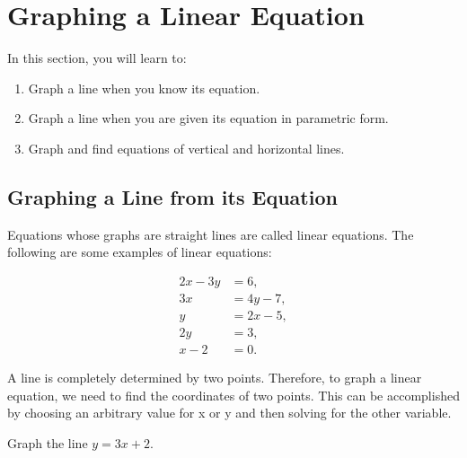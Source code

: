\section{Graphing a Linear Equation}

In this section, you will learn to:

\begin{enumerate}
    \item Graph a line when you know its equation.
    \item Graph a line when you are given its equation in parametric form.
    \item Graph and find equations of vertical and horizontal lines.
\end{enumerate}

\subsection{Graphing a Line from its Equation}

Equations whose graphs are straight lines are called linear equations. The following are some examples of linear equations:

\begin{align*}
2x - 3y &= 6, \\
3x &= 4y - 7, \\
y &= 2x - 5, \\
2y &= 3, \\
x - 2 &= 0.
\end{align*}

A line is completely determined by two points. Therefore, to graph a linear equation, we need to find the coordinates of two points. This can be accomplished by choosing an arbitrary value for x or y and then solving for the other variable.

\begin{example}
Graph the line \(y = 3x + 2\).
\end{example}

